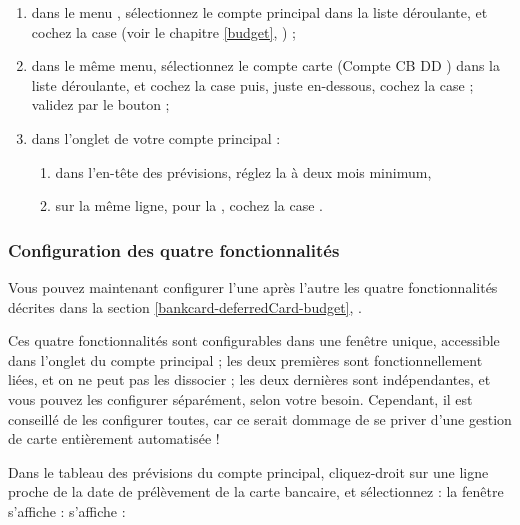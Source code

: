 \begin{enumerate}
	 \item dans le menu , sélectionnez le compte principal dans la liste déroulante, et cochez la case  (voir le chapitre \vref{budget}, ) ;	
	 \item dans le même menu, sélectionnez le compte carte (\og Compte CB DD \fg{}) dans la liste déroulante, et cochez la case  puis, juste en-dessous, cochez la case  ; validez par le bouton  ;	
	 \item dans l'onglet  de votre compte principal :
		\begin{enumerate}
			 \item dans l'en-tête des prévisions, réglez la  à deux mois minimum,
			 \item sur la même ligne, pour la , cochez la case .	 
		\end{enumerate}
\end{enumerate}


\subsubsection{Configuration des quatre fonctionnalités}

Vous pouvez maintenant configurer l'une après l'autre les quatre fonctionnalités décrites dans la section \vref{bankcard-deferredCard-budget}, .

Ces quatre fonctionnalités sont configurables dans une fenêtre unique, accessible dans l'onglet  du compte principal ; les deux premières sont fonctionnellement liées, et on ne peut pas les dissocier ; les deux dernières sont indépendantes, et vous pouvez les configurer séparément, selon votre besoin. Cependant, il est conseillé de les configurer toutes, car ce serait dommage de se priver d'une gestion de carte entièrement automatisée !

Dans le tableau des prévisions du compte principal, cliquez-droit sur une ligne proche de la date de prélèvement de la carte bancaire, et sélectionnez  : la fenêtre  \ifIllustration s'affiche :
\else s'affiche : 
\fi

